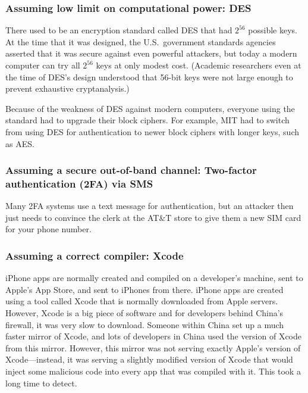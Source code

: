 \subsubsection{Assuming low limit on computational power: DES}
There used to be an encryption standard called DES that had $2^{56}$ possible keys.
At the time that it was designed, the U.S.~government standards agencies asserted that it was
secure against even powerful attackers,
but today a modern computer can try all $2^{56}$ keys at only modest cost.
(Academic researchers even at the time of DES's
design understood that 56-bit keys were not large
enough to prevent exhaustive
cryptanalysis.\autocite{DH77})

Because of the weakness of DES against modern computers,
everyone using the standard had to upgrade their block ciphers.
For example, MIT had to switch from using DES for authentication 
to newer block ciphers with longer keys, such as AES.

\subsubsection{Assuming a secure out-of-band channel: Two-factor authentication (2FA) via SMS}
Many 2FA systems use a text message for authentication, but an attacker then
just needs to convince the clerk at the AT\&T store to give them a new SIM card for your phone number.

\subsubsection{Assuming a correct compiler: Xcode}\label{sec:intro:xcode}
iPhone apps are normally created and compiled on a developer's machine, sent to Apple's App Store, and sent to iPhones from there. iPhone apps are created using a tool called Xcode that is normally downloaded from Apple servers. However, Xcode is a big piece of software and for developers behind China's firewall, it was very slow to download. Someone within China set up a much faster mirror of Xcode, and lots of developers in China used the version of Xcode from this mirror. However, this mirror was not serving exactly Apple's version of Xcode---instead, it was serving a slightly modified version of Xcode that would inject some malicious code into every app that was compiled with it. This took a long time to detect.


